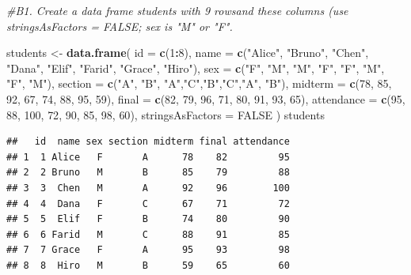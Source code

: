 \documentclass[
]{article}
\newenvironment{Shaded}{\begin{snugshade}}{\end{snugshade}}
\newcommand{\AttributeTok}[1]{\textcolor[rgb]{0.13,0.29,0.53}{#1}}
\newcommand{\CommentTok}[1]{\textcolor[rgb]{0.56,0.35,0.01}{\textit{#1}}}
\newcommand{\ConstantTok}[1]{\textcolor[rgb]{0.56,0.35,0.01}{#1}}
\newcommand{\DecValTok}[1]{\textcolor[rgb]{0.00,0.00,0.81}{#1}}
\newcommand{\FunctionTok}[1]{\textcolor[rgb]{0.13,0.29,0.53}{\textbf{#1}}}
\newcommand{\NormalTok}[1]{#1}
\newcommand{\OtherTok}[1]{\textcolor[rgb]{0.56,0.35,0.01}{#1}}
\newcommand{\SpecialCharTok}[1]{\textcolor[rgb]{0.81,0.36,0.00}{\textbf{#1}}}
\newcommand{\StringTok}[1]{\textcolor[rgb]{0.31,0.60,0.02}{#1}}
\begin{document}
\begin{Shaded}
\begin{Highlighting}[]
\CommentTok{\#B1. Create a data frame students with 9 rowsand these columns (use stringsAsFactors = FALSE; sex is "M" or "F".}

\NormalTok{students }\OtherTok{\textless{}{-}} \FunctionTok{data.frame}\NormalTok{(}
  \AttributeTok{id =} \FunctionTok{c}\NormalTok{(}\DecValTok{1}\SpecialCharTok{:}\DecValTok{8}\NormalTok{),}
  \AttributeTok{name =} \FunctionTok{c}\NormalTok{(}\StringTok{"Alice"}\NormalTok{, }\StringTok{"Bruno"}\NormalTok{, }\StringTok{"Chen"}\NormalTok{, }\StringTok{"Dana"}\NormalTok{, }\StringTok{"Elif"}\NormalTok{, }\StringTok{"Farid"}\NormalTok{, }\StringTok{"Grace"}\NormalTok{, }\StringTok{"Hiro"}\NormalTok{),}
  \AttributeTok{sex =} \FunctionTok{c}\NormalTok{(}\StringTok{"F"}\NormalTok{, }\StringTok{"M"}\NormalTok{, }\StringTok{"M"}\NormalTok{, }\StringTok{"F"}\NormalTok{, }\StringTok{"F"}\NormalTok{, }\StringTok{"M"}\NormalTok{, }\StringTok{"F"}\NormalTok{, }\StringTok{"M"}\NormalTok{),}
  \AttributeTok{section =} \FunctionTok{c}\NormalTok{(}\StringTok{"A"}\NormalTok{, }\StringTok{"B"}\NormalTok{, }\StringTok{"A"}\NormalTok{,}\StringTok{"C"}\NormalTok{,}\StringTok{"B"}\NormalTok{,}\StringTok{"C"}\NormalTok{,}\StringTok{"A"}\NormalTok{, }\StringTok{"B"}\NormalTok{),}
  \AttributeTok{midterm =} \FunctionTok{c}\NormalTok{(}\DecValTok{78}\NormalTok{, }\DecValTok{85}\NormalTok{, }\DecValTok{92}\NormalTok{, }\DecValTok{67}\NormalTok{, }\DecValTok{74}\NormalTok{, }\DecValTok{88}\NormalTok{, }\DecValTok{95}\NormalTok{, }\DecValTok{59}\NormalTok{),}
  \AttributeTok{final =} \FunctionTok{c}\NormalTok{(}\DecValTok{82}\NormalTok{, }\DecValTok{79}\NormalTok{, }\DecValTok{96}\NormalTok{, }\DecValTok{71}\NormalTok{, }\DecValTok{80}\NormalTok{, }\DecValTok{91}\NormalTok{, }\DecValTok{93}\NormalTok{, }\DecValTok{65}\NormalTok{),}
  \AttributeTok{attendance =} \FunctionTok{c}\NormalTok{(}\DecValTok{95}\NormalTok{, }\DecValTok{88}\NormalTok{, }\DecValTok{100}\NormalTok{, }\DecValTok{72}\NormalTok{, }\DecValTok{90}\NormalTok{, }\DecValTok{85}\NormalTok{, }\DecValTok{98}\NormalTok{, }\DecValTok{60}\NormalTok{),}
  \AttributeTok{stringsAsFactors =} \ConstantTok{FALSE}
\NormalTok{)}
\NormalTok{students}
\end{Highlighting}
\end{Shaded}

\begin{verbatim}
##   id  name sex section midterm final attendance
## 1  1 Alice   F       A      78    82         95
## 2  2 Bruno   M       B      85    79         88
## 3  3  Chen   M       A      92    96        100
## 4  4  Dana   F       C      67    71         72
## 5  5  Elif   F       B      74    80         90
## 6  6 Farid   M       C      88    91         85
## 7  7 Grace   F       A      95    93         98
## 8  8  Hiro   M       B      59    65         60
\end{verbatim}
\end{document}
